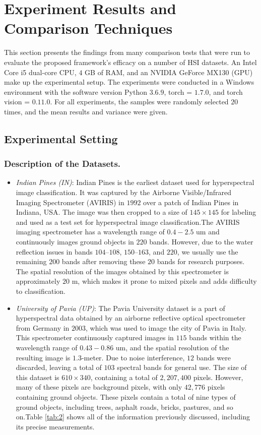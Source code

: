 \documentclass[]{interact}
\theoremstyle{plain}%
\theoremstyle{definition}
\theoremstyle{remark}
\begin{document}
\section{Experiment Results and Comparison Techniques}

This section presents the findings from many comparison tests that were run to evaluate the proposed framework's efficacy on a number of HSI datasets. An Intel Core i5 dual-core CPU, $4$ GB of RAM, and an NVIDIA GeForce MX130 (GPU) make up the experimental setup. The experiments were conducted in a Windows environment with the software version Python $3.6.9$, torch = $1.7.0$, and torch vision = $0.11.0$. For all experiments, the samples were randomly selected $20$ times, and the mean results and variance were given.


\subsection{Experimental Setting}

\subsubsection{Description of the Datasets.}


\begin{itemize}
\item \textit{Indian Pines (IN)}: Indian Pines is the earliest dataset used for hyperspectral image classification. It was captured by the Airborne Visible/Infrared Imaging Spectrometer (AVIRIS) in $1992$ over a patch of Indian Pines in Indiana, USA. The image was then cropped to a size of $145 \times 145$ for labeling and used as a test set for hyperspectral image classification.The AVIRIS imaging spectrometer has a wavelength range of $0.4-2.5$ um and continuously images ground objects in $220$ bands. However, due to the water reflection issues in bands $104–108$, $150–163$, and $220$, we usually use the remaining $200$ bands after removing these $20$ bands for research purposes. The spatial resolution of the images obtained by this spectrometer is approximately $20$ m, which makes it prone to mixed pixels and adds difficulty to classification. 
\item \textit{University of Pavia (UP)}: The Pavia University dataset is a part of hyperspectral data obtained by an airborne reflective optical spectrometer from Germany in $2003$, which was used to image the city of Pavia in Italy. This spectrometer continuously captured images in $115$ bands within the wavelength range of $0.43-0.86$ um, and the spatial resolution of the resulting image is $1.3$-meter. Due to noise interference, $12$ bands were discarded, leaving a total of $103$ spectral bands for general use. The size of this dataset is $610 \times 340$, containing a total of $2,207,400$ pixels. However, many of these pixels are background pixels, with only $42,776$ pixels containing ground objects. These pixels contain a total of nine types of ground objects, including trees, asphalt roads, bricks, pastures, and so on.Table \ref{tab:2} shows all of the information previously discussed, including its precise measurements.
\end{itemize}
\end{document}
